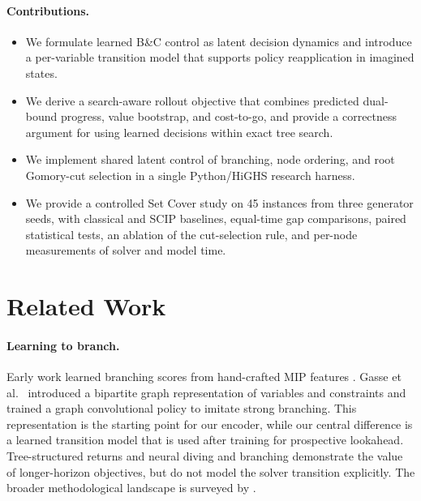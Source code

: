 \documentclass[11pt,a4paper]{article}
\newcommand{\BnC}{B\&C}
\begin{document}
\paragraph{Contributions.}
\begin{itemize}
  \item We formulate learned \BnC{} control as latent decision dynamics and introduce a per-variable transition model that supports policy reapplication in imagined states.
  \item We derive a search-aware rollout objective that combines predicted dual-bound progress, value bootstrap, and cost-to-go, and provide a correctness argument for using learned decisions within exact tree search.
  \item We implement shared latent control of branching, node ordering, and root Gomory-cut selection in a single Python/HiGHS research harness.
  \item We provide a controlled Set Cover study on 45 instances from three generator seeds, with classical and SCIP baselines, equal-time gap comparisons, paired statistical tests, an ablation of the cut-selection rule, and per-node measurements of solver and model time.
\end{itemize}

\section{Related Work}

\paragraph{Learning to branch.}
Early work learned branching scores from hand-crafted MIP features \citep{khalil2016learning}. Gasse et al.~\citep{gasse2019exact} introduced a bipartite graph representation of variables and constraints and trained a graph convolutional policy to imitate strong branching. This representation is the starting point for our encoder, while our central difference is a learned transition model that is used after training for prospective lookahead. Tree-structured returns \citep{scavuzzo2022learning} and neural diving and branching \citep{nair2020solving} demonstrate the value of longer-horizon objectives, but do not model the solver transition explicitly. The broader methodological landscape is surveyed by \citet{bengio2021machine}.
\end{document}
